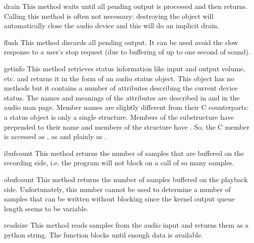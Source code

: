 \begin{funcdesc}{drain}{}
This method waits until all pending output is processed and then returns.
Calling this method is often not necessary: destroying the object will
automatically close the audio device and this will do an implicit drain.
\end{funcdesc}

\begin{funcdesc}{flush}{}
This method discards all pending output. It can be used avoid the
slow response to a user's stop request (due to buffering of up to one
second of sound).
\end{funcdesc}

\begin{funcdesc}{getinfo}{}
This method retrieves status information like input and output volume,
etc. and returns it in the form of
an audio status object. This object has no methods but it contains a
number of attributes describing the current device status. The names
and meanings of the attributes are described in
 and in the audio man page. Member names
are slightly different from their C counterparts: a status object is
only a single structure. Members of the  substructure have
 prepended to their name and members of the 
structure have . So, the C member  is
accessed as ,  as 
and  plainly as .
\end{funcdesc}

\begin{funcdesc}{ibufcount}{}
This method returns the number of samples that are buffered on the
recording side, i.e.
the program will not block on a  call of so many samples.
\end{funcdesc}

\begin{funcdesc}{obufcount}{}
This method returns the number of samples buffered on the playback
side. Unfortunately, this number cannot be used to determine a number
of samples that can be written without blocking since the kernel
output queue length seems to be variable.
\end{funcdesc}

\begin{funcdesc}{read}{size}
This method reads  samples from the audio input and returns
them as a python string. The function blocks until enough data is available.
\end{funcdesc}


